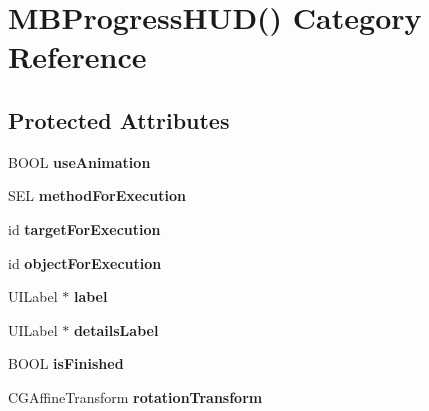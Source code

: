 \hypertarget{category_m_b_progress_h_u_d_07_08}{\section{M\+B\+Progress\+H\+U\+D() Category Reference}
\label{category_m_b_progress_h_u_d_07_08}
}
\subsection*{Protected Attributes}
\begin{DoxyCompactItemize}
\item 
\hypertarget{category_m_b_progress_h_u_d_07_08_a02d87dc36a3b447307dd9ded05a00125}{B\+O\+O\+L {\bfseries use\+Animation}}\label{category_m_b_progress_h_u_d_07_08_a02d87dc36a3b447307dd9ded05a00125}

\item 
\hypertarget{category_m_b_progress_h_u_d_07_08_a7456f23346940d6817ba470c51a1744b}{S\+E\+L {\bfseries method\+For\+Execution}}\label{category_m_b_progress_h_u_d_07_08_a7456f23346940d6817ba470c51a1744b}

\item 
\hypertarget{category_m_b_progress_h_u_d_07_08_acc585389227da5b3f544266043387b76}{id {\bfseries target\+For\+Execution}}\label{category_m_b_progress_h_u_d_07_08_acc585389227da5b3f544266043387b76}

\item 
\hypertarget{category_m_b_progress_h_u_d_07_08_aa5190868986978809287124475d0af72}{id {\bfseries object\+For\+Execution}}\label{category_m_b_progress_h_u_d_07_08_aa5190868986978809287124475d0af72}

\item 
\hypertarget{category_m_b_progress_h_u_d_07_08_ad67454c02b60533cf97401be15c37286}{U\+I\+Label $\ast$ {\bfseries label}}\label{category_m_b_progress_h_u_d_07_08_ad67454c02b60533cf97401be15c37286}

\item 
\hypertarget{category_m_b_progress_h_u_d_07_08_a4185a66323794638e5baa6da7a668e46}{U\+I\+Label $\ast$ {\bfseries details\+Label}}\label{category_m_b_progress_h_u_d_07_08_a4185a66323794638e5baa6da7a668e46}

\item 
\hypertarget{category_m_b_progress_h_u_d_07_08_adf7a5c33432db7d4a20e3737adbe5302}{B\+O\+O\+L {\bfseries is\+Finished}}\label{category_m_b_progress_h_u_d_07_08_adf7a5c33432db7d4a20e3737adbe5302}

\item 
\hypertarget{category_m_b_progress_h_u_d_07_08_a27ab1a02c2774a908925be63209bce15}{C\+G\+Affine\+Transform {\bfseries rotation\+Transform}}\label{category_m_b_progress_h_u_d_07_08_a27ab1a02c2774a908925be63209bce15}

\end{DoxyCompactItemize}
